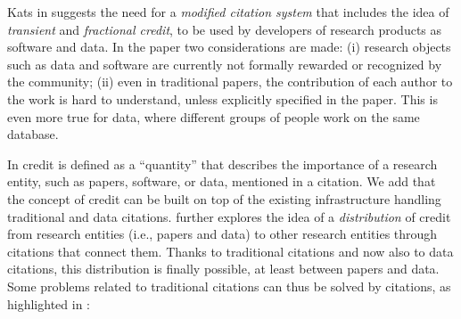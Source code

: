Kats in \citep{transitiveCreditKatz2014} suggests the need for a \emph{modified citation system} that includes the idea of \emph{transient} and \emph{fractional credit}, to be used by developers of research products as software and data.
In the paper two considerations are made: (i) research objects such as data and software are currently not formally rewarded or recognized by the community; 
(ii) even in traditional papers, the contribution of each author to the work is hard to understand, unless explicitly specified in the paper. 
This is even more true for data, where different groups of people work on the same database.

In \citep{transitiveCreditKatz2014} credit is defined as a ``quantity'' that describes the importance of a research entity, such as papers, software, or data, mentioned in a citation. 
We add that the concept of credit can be built on top of the existing infrastructure handling traditional and data citations.
\citep{transitiveCreditKatz2014} further explores the idea of a \emph{distribution} of credit from research entities (i.e., papers and data) to other research entities through citations that connect them. 
Thanks to traditional citations and now also to data citations, this distribution is finally possible, at least between papers and data. 
Some problems related to traditional citations can thus be solved by citations, as highlighted in \citep{transitiveCreditKatz2014}:

